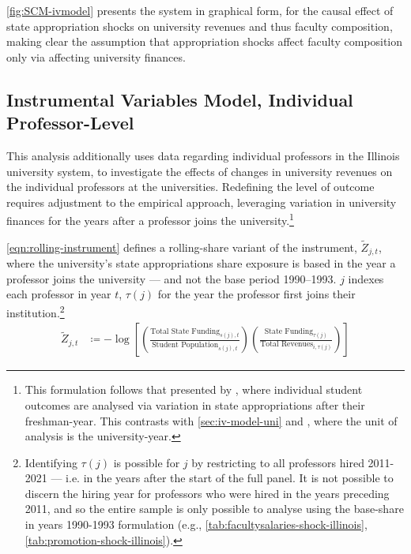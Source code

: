 \autoref{fig:SCM-ivmodel} presents the system in graphical form, for the causal effect of state appropriation shocks on university revenues and thus faculty composition, making clear the assumption that appropriation shocks affect faculty composition only via affecting university finances.


\subsection{Instrumental Variables Model, Individual Professor-Level}
\label{sec:iv-model-indiv}

This analysis additionally uses data regarding individual professors in the Illinois university system, to investigate the effects of changes in university revenues on the individual professors at the universities.
Redefining the level of outcome requires adjustment to the empirical approach, leveraging variation in university finances for the years after a professor joins the university.\footnote{
    This formulation follows that presented by \cite{NBERw27885}, where individual student outcomes are analysed via variation in state appropriations after their freshman-year.
    This contrasts with \autoref{sec:iv-model-uni} and \cite{NBERw23736}, where the unit of analysis is the university-year.
}

\autoref{eqn:rolling-instrument} defines a rolling-share variant of the instrument, $\tilde Z_{j,t}$, where the university's state appropriations share exposure is based in the year a professor joins the university --- and not the base period 1990--1993.
$j$ indexes each professor in year $t$, $\tau(j)$ for the year the professor first joins their institution.\footnote{
    Identifying $\tau(j)$ is possible for $j$ by restricting to all professors hired 2011-2021 --- i.e. in the years after the start of the full panel.
    It is not possible to discern the hiring year for professors who  were hired in the years preceding 2011, and so the entire sample is only possible to analyse using the base-share in years 1990-1993 formulation (e.g., \autoref{tab:facultysalaries-shock-illinois}, \ref{tab:promotion-shock-illinois}).
}
\begin{align}
    \label{eqn:rolling-instrument}
    \tilde Z_{j,t} &\coloneqq - \log \left[
    \left( \frac{\text{Total State Funding}_{s(j),t}}{\text{Student Population}_{s(j),t}} \right)
    \left( \frac{\text{State Funding}_{\tau(j)}}{\text{Total Revenues}_{i,\tau(j)}} \right) \right]
\end{align}

